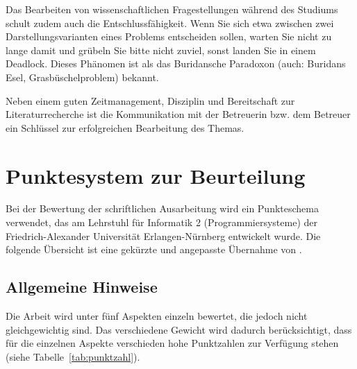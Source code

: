\documentclass[
    fontsize=12pt,
    headings=small,
    parskip=half,           %
    bibliography=totoc,
    numbers=noenddot,       %
    open=any,               %
    ]{scrreprt}
\begin{document}
Das Bearbeiten von wissenschaftlichen Fragestellungen während des Studiums schult zudem auch die Entschlussfähigkeit. Wenn Sie sich etwa zwischen zwei Darstellungsvarianten eines Problems entscheiden sollen, warten Sie nicht zu lange damit und grübeln Sie bitte nicht zuviel, sonst landen Sie in einem Deadlock. Dieses Phänomen ist als das Buridansche Paradoxon (auch: Buridans Esel, Grasbüschelproblem) \cite{BuridansAss} bekannt.

Neben einem guten Zeitmanagement, Disziplin und Bereitschaft zur Literaturrecherche ist die Kommunikation mit der Betreuerin bzw. dem Betreuer ein Schlüssel zur erfolgreichen Bearbeitung des Themas.


\begin{raggedright}         %
  \printbibliography        %
  \label{sec:literaturverzeichnis}
\end{raggedright}


\appendix
\setcounter{figure}{0}
\renewcommand\thetable{A.\arabic{figure}}
\setcounter{table}{0}
\renewcommand\thetable{A.\arabic{table}}

\chapter*{Punktesystem zur Beurteilung}

Bei der Bewertung der schriftlichen Ausarbeitung wird ein Punkteschema verwendet, das am Lehrstuhl für Informatik 2 (Programmiersysteme) der Friedrich-Alexander Universität Erlangen-Nürnberg entwickelt wurde. Die folgende Übersicht ist eine gekürzte und angepasste Übernahme von \cite{faui2}.

\section*{Allgemeine Hinweise}

Die Arbeit wird unter fünf Aspekten einzeln bewertet, die jedoch nicht gleichgewichtig sind. Das verschiedene Gewicht wird dadurch berücksichtigt, dass für die einzelnen Aspekte verschieden hohe Punktzahlen zur Verfügung stehen (siehe Tabelle~\ref{tab:punktzahl}).
\end{document}

